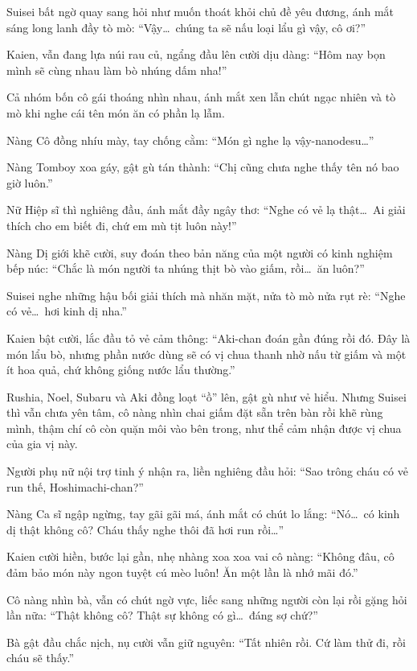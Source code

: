 \documentclass[../main.tex]{subfiles}
\begin{document}
Suisei bất ngờ quay sang hỏi như muốn thoát khỏi chủ đề yêu đương, ánh mắt sáng long lanh đầy tò mò: ``Vậy\dots\ chúng ta sẽ nấu loại lẩu gì vậy, cô ơi?''

Kaien, vẫn đang lựa núi rau củ, ngẩng đầu lên cười dịu dàng: ``Hôm nay bọn mình sẽ cùng nhau làm bò nhúng dấm nha!''

Cả nhóm bốn cô gái thoáng nhìn nhau, ánh mắt xen lẫn chút ngạc nhiên và tò mò khi nghe cái tên món ăn có phần lạ lẫm.

Nàng Cô đồng nhíu mày, tay chống cằm: ``Món gì nghe lạ vậy-nanodesu\dots''

Nàng Tomboy xoa gáy, gật gù tán thành: ``Chị cũng chưa nghe thấy tên nó bao giờ luôn.''

Nữ Hiệp sĩ thì nghiêng đầu, ánh mắt đầy ngây thơ: ``Nghe có vẻ lạ thật\dots\ Ai giải thích cho em biết đi, chứ em mù tịt luôn này!''

Nàng Dị giới khẽ cười, suy đoán theo bản năng của một người có kinh nghiệm bếp núc: ``Chắc là món người ta nhúng thịt bò vào giấm, rồi\dots\ ăn luôn?''

Suisei nghe những hậu bối giải thích mà nhăn mặt, nửa tò mò nửa rụt rè: ``Nghe có vẻ\dots\ hơi kinh dị nha.''

Kaien bật cười, lắc đầu tỏ vẻ cảm thông: ``Aki-chan đoán gần đúng rồi đó. Đây là món lẩu bò, nhưng phần nước dùng sẽ có vị chua thanh nhờ nấu từ giấm và một ít hoa quả, chứ không giống nước lẩu thường.''

Rushia, Noel, Subaru và Aki đồng loạt ``ồ'' lên, gật gù như vẻ hiểu. Nhưng Suisei thì vẫn chưa yên tâm, cô nàng nhìn chai giấm đặt sẵn trên bàn rồi khẽ rùng mình, thậm chí cô còn quặn môi vào bên trong, như thể cảm nhận được vị chua của gia vị này.

Người phụ nữ nội trợ tinh ý nhận ra, liền nghiêng đầu hỏi: ``Sao trông cháu có vẻ run thế, Hoshimachi-chan?''

Nàng Ca sĩ ngập ngừng, tay gãi gãi má, ánh mắt có chút lo lắng: ``Nó\dots\ có kinh dị thật không cô? Cháu thấy nghe thôi đã hơi run rồi\dots''

Kaien cười hiền, bước lại gần, nhẹ nhàng xoa xoa vai cô nàng: ``Không đâu, cô đảm bảo món này ngon tuyệt cú mèo luôn! Ăn một lần là nhớ mãi đó.''

Cô nàng nhìn bà, vẫn có chút ngờ vực, liếc sang những người còn lại rồi gặng hỏi lần nữa: ``Thật không cô? Thật sự không có gì\dots\ đáng sợ chứ?''

Bà gật đầu chắc nịch, nụ cười vẫn giữ nguyên: ``Tất nhiên rồi. Cứ làm thử đi, rồi cháu sẽ thấy.''
\end{document}
